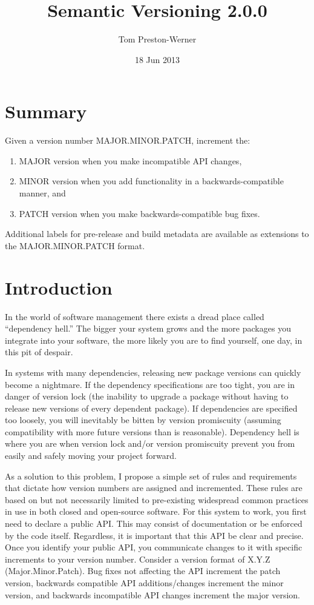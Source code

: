 \documentclass[a4paper,12pt,notitlepage,twoside,openright]{article}
\title{Semantic Versioning 2.0.0}
\author{Tom Preston-Werner}
\date{18 Jun 2013}
\begin{document}
\maketitle

\hypertarget{summary}{%
\section{Summary}\label{summary}}

Given a version number MAJOR.MINOR.PATCH, increment the:

\begin{enumerate}
\def\labelenumi{\arabic{enumi}.}
\item
  MAJOR version when you make incompatible API changes,
\item
  MINOR version when you add functionality in a backwards-compatible
  manner, and
\item
  PATCH version when you make backwards-compatible bug fixes.
\end{enumerate}

Additional labels for pre-release and build metadata are available as
extensions to the MAJOR.MINOR.PATCH format.

\hypertarget{introduction}{%
\section{Introduction}\label{introduction}}

In the world of software management there exists a dread place called
``dependency hell.'' The bigger your system grows and the more packages
you integrate into your software, the more likely you are to find
yourself, one day, in this pit of despair.

In systems with many dependencies, releasing new package versions can
quickly become a nightmare. If the dependency specifications are too
tight, you are in danger of version lock (the inability to upgrade a
package without having to release new versions of every dependent
package). If dependencies are specified too loosely, you will inevitably
be bitten by version promiscuity (assuming compatibility with more
future versions than is reasonable). Dependency hell is where you are
when version lock and/or version promiscuity prevent you from easily and
safely moving your project forward.

As a solution to this problem, I propose a simple set of rules and
requirements that dictate how version numbers are assigned and
incremented. These rules are based on but not necessarily limited to
pre-existing widespread common practices in use in both closed and
open-source software. For this system to work, you first need to declare
a public API. This may consist of documentation or be enforced by the
code itself. Regardless, it is important that this API be clear and
precise. Once you identify your public API, you communicate changes to
it with specific increments to your version number. Consider a version
format of X.Y.Z (Major.Minor.Patch). Bug fixes not affecting the API
increment the patch version, backwards compatible API additions/changes
increment the minor version, and backwards incompatible API changes
increment the major version.
\end{document}
